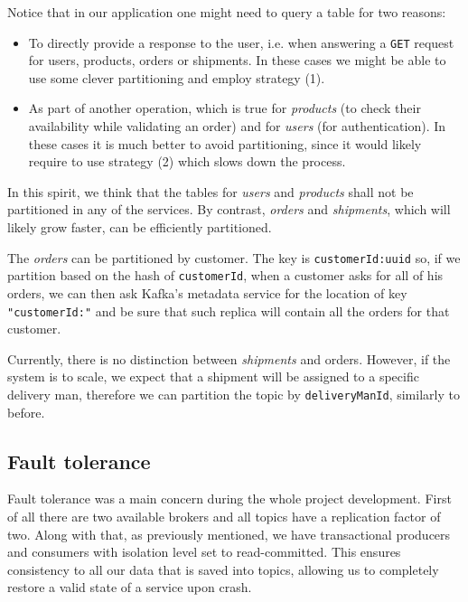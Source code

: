 \noindent
Notice that in our application one might need to query a table for two reasons:
\begin{itemize}
    \item To directly provide a response to the user, i.e. when answering a \texttt{GET} request for users, products, orders or shipments. In these cases we might be able to use some clever partitioning and employ strategy (1).
    \item As part of another operation, which is true for \emph{products} (to check their availability while validating an order) and for \emph{users} (for authentication). In these cases it is much better to avoid partitioning, since it would likely require to use strategy (2) which slows down the process.
\end{itemize}
In this spirit, we think that the tables for \emph{users} and \emph{products} shall not be partitioned in any of the services. By contrast, \emph{orders} and \emph{shipments}, which will likely grow faster, can be efficiently partitioned.

The \emph{orders} can be partitioned by customer. The key is \texttt{customerId:uuid} so, if we partition based on the hash of \texttt{customerId}, when a customer asks for all of his orders, we can then ask Kafka's metadata service for the location of key \texttt{"customerId:"} and be sure that such replica will contain all the orders for that customer.

Currently, there is no distinction between \emph{shipments} and orders. However, if the system is to scale, we expect that a shipment will be assigned to a specific delivery man, therefore we can partition the topic by \texttt{deliveryManId}, similarly to before.

\subsection{Fault tolerance}
Fault tolerance was a main concern during the whole project development. First of all there are two available brokers and all topics have a replication factor of two. Along with that, as previously mentioned, we have transactional producers and consumers with isolation level set to read-committed. This ensures consistency to all our data that is saved into topics, allowing us to completely restore a valid state of a service upon crash.